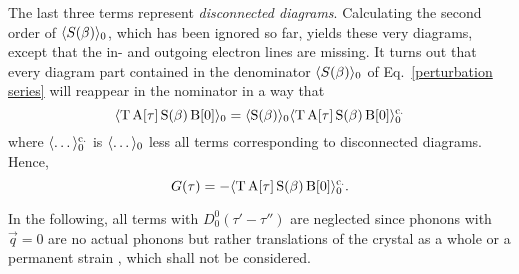 The last three terms represent \emph{disconnected diagrams}. Calculating the
second order of $\langle S(\beta)\rangle_0$, which has been ignored so far, yields these
very diagrams, except that the in- and outgoing electron lines are missing. It
turns out that every diagram part contained in the denominator $\langle S(\beta)\rangle_0$
of Eq.~\ref{perturbation series} will reappear in the nominator in a way that
%
\begin{equation*}
    \langle\mathrm T \, \mathrm A[\tau] \, \mathrm S(\beta) \, \mathrm B[0]\rangle_0 =
    \langle\mathrm S(\beta)\rangle_0
    \langle\mathrm T \, \mathrm A[\tau] \, \mathrm S(\beta) \, \mathrm B[0]\rangle_0 \sp{\text{c.}}
\end{equation*}
%
where $\langle\dots\rangle_0 \sp{\text{c.}}$ is $\langle\dots\rangle_0$ less all terms corresponding to
disconnected diagrams. Hence,
%
\begin{equation*}
    G(\tau) = -\langle\mathrm T \, \mathrm A[\tau] \, \mathrm S(\beta) \, \mathrm B[0]\rangle_0
    \sp{\text{c.}}.
\end{equation*}

In the following, all terms with $D^0_0(\tau' - \tau'')$ are neglected since
phonons with $\vec q = 0$ are no actual phonons but rather translations of the
crystal as a whole or a permanent strain \cite[p.~82]{Mahan00}, which shall not
be considered.


